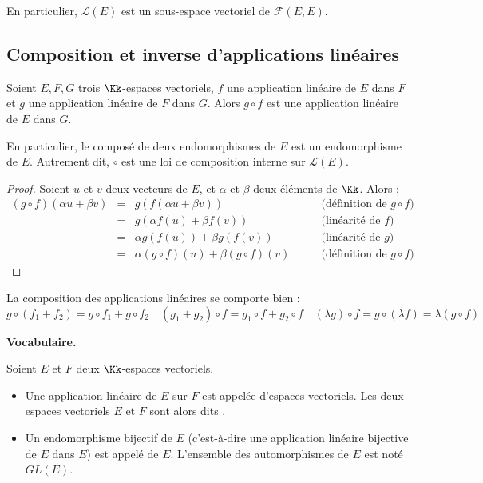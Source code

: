 \documentclass[class=report,crop=false]{standalone}
\begin{document}
En particulier, $\mathcal{L}(E)$ est un sous-espace vectoriel de $\mathcal{F}(E,E)$.

\subsection{Composition et inverse d'applications linéaires}


\begin{proposition}
Soient $E, F, G$  trois $\Kk$-espaces vectoriels, $f$ une application linéaire de $E$ dans $F$ et
$g$ une application linéaire de $F$ dans $G$. Alors  $g \circ f$ est une application linéaire de $E$ dans $G$.
\end{proposition}

\begin{remarque*}
En particulier, le composé de deux endomorphismes de $E$ est un endomorphisme de $E$.
Autrement dit, $\circ$ est une loi de composition interne sur $\mathcal{L}(E)$.
\end{remarque*}

\begin{proof}
Soient $u$ et $v$ deux vecteurs de $E$, et $\alpha$ et $\beta$ deux éléments de $\Kk$.
Alors :
$$\begin{array}{rclr}
(g \circ f)(\alpha u + \beta v)
 & = & g\left ( f(\alpha u + \beta v) \right ) &\qquad \text{(définition de $g \circ f$)}\\
 & = & g \left ( \alpha f(u) + \beta f(v)\right ) &\qquad \text{(linéarité de $f$)}\\
 & = & \alpha g\left ( f(u)\right ) + \beta g\left ( f(v)\right ) &\qquad \text{(linéarité de $g$)} \\
  & = & \alpha (g \circ f) (u) + \beta (g \circ f) (v)  &\qquad \text{(définition de $g \circ f$)}
\end{array}$$
\end{proof}

La composition des applications linéaires se comporte bien :
$$g \circ (f_1+f_2)=g \circ f_1+ g \circ f_2
\quad
(g_1+g_2) \circ f =g_1 \circ f + g_2 \circ f
\quad
(\lambda g) \circ f =g \circ (\lambda f) =\lambda (g \circ f)
$$

\bigskip


\textbf{Vocabulaire.}

Soient $E$ et $F$ deux $\Kk$-espaces vectoriels.

\begin{itemize}
  \item Une application linéaire  de $E$ sur $F$ est appelée
   d'espaces vectoriels. Les deux espaces vectoriels $E$ et $F$
  sont alors dits .

  \item Un endomorphisme bijectif de $E$ (c'est-à-dire une application linéaire bijective de $E$ dans $E$)
  est appelé  de $E$.
   L'ensemble des automorphismes de $E$ est noté $GL(E)$.
\end{itemize}
\end{document}
